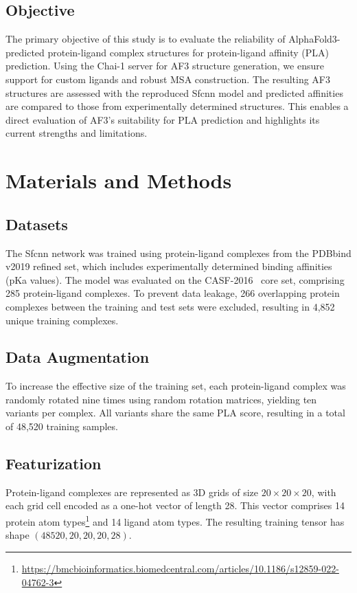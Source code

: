 \documentclass[unnumsec,webpdf,contemporary,large]{oup-authoring-template}
\theoremstyle{thmstyleone}%
\theoremstyle{thmstyletwo}%
\theoremstyle{thmstylethree}%
\begin{document}
\subsection{Objective}
The primary objective of this study is to evaluate the reliability of AlphaFold3-predicted protein-ligand complex structures for protein-ligand affinity (PLA) prediction. Using the Chai-1 server for AF3 structure generation, we ensure support for custom ligands and robust MSA construction. The resulting AF3 structures are assessed with the reproduced Sfcnn model and predicted affinities are compared to those from experimentally determined structures. This enables a direct evaluation of AF3's suitability for PLA prediction and highlights its current strengths and limitations.

\section{Materials and Methods}
\vspace{0.5em}
\subsection{Datasets}
The Sfcnn network was trained using protein-ligand complexes from the PDBbind v2019 refined set\cite{Wang2005PDBbind}, which includes experimentally determined binding affinities (pKa values). The model was evaluated on the CASF-2016~\cite{su2018comparative} core set, comprising 285 protein-ligand complexes. To prevent data leakage, 266 overlapping protein complexes between the training and test sets were excluded, resulting in 4,852 unique training complexes.

\subsection{Data Augmentation}
To increase the effective size of the training set, each protein-ligand complex was randomly rotated nine times using random rotation matrices, yielding ten variants per complex. All variants share the same PLA score, resulting in a total of 48,520 training samples.

\subsection{Featurization}
Protein-ligand complexes are represented as 3D grids of size $20 \times 20 \times 20$, with each grid cell encoded as a one-hot vector of length 28. This vector comprises 14 protein atom types\footnote{\url{https://bmcbioinformatics.biomedcentral.com/articles/10.1186/s12859-022-04762-3}} and 14 ligand atom types. The resulting training tensor has shape $(48520, 20, 20, 20, 28)$.
\end{document}
